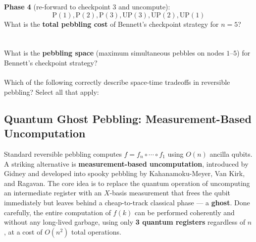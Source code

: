 \textbf{Phase 4} (re-forward to checkpoint $3$ and uncompute):
\begin{equation}
    \mathrm{P(1), P(2), P(3), UP(3), UP(2), UP(1)}
\end{equation}
What is the \textbf{total pebbling cost} of Bennett's checkpoint strategy for $n=5$?\\
\noindent{} 
\newline \\\\
What is the \textbf{pebbling space} (maximum simultaneous pebbles on nodes $1$–$5$) for Bennett's checkpoint strategy?\\
\noindent{} 
\newline \\
Which of the following correctly describe space-time tradeoffs in reversible pebbling? Select all that apply:
\noindent{}
\newpage
\subsection{Quantum Ghost Pebbling: Measurement-Based Uncomputation}
Standard reversible pebbling computes $f = f_n\circ \cdots \circ f_1$ using $O(n)$ ancilla qubits. A striking alternative is \textbf{measurement-based uncomputation}, introduced by Gidney and developed into spooky pebbling by Kahanamoku-Meyer, Van Kirk, and Ragavan. The core idea is to replace the quantum operation of uncomputing an intermediate register with an $X$-basis measurement that frees the qubit immediately but leaves behind a cheap-to-track classical phase — a \textbf{ghost}. Done carefully, the entire computation of $f(k)$ can be performed coherently and without any long-lived garbage, using only \textbf{3 quantum registers} regardless of $n$, at a cost of $O(n^2)$ total operations.

